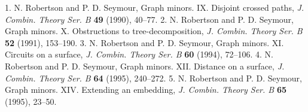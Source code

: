 
1. N. Robertson and P. D. Seymour, Graph minors. IX. Disjoint crossed paths, \textit{J. Combin. Theory Ser. B} \textbf{49} (1990), 40--77. 2. N. Robertson and P. D. Seymour, Graph minors. X. Obstructions to tree-decomposition, \textit{J. Combin. Theory Ser. B} \textbf{52} (1991), 153--190. 3. N. Robertson and P. D. Seymour, Graph minors. XI. Circuits on a surface, \textit{J. Combin. Theory Ser. B} \textbf{60} (1994), 72--106. 4. N. Robertson and P. D. Seymour, Graph minors. XII. Distance on a surface, \textit{J. Combin. Theory Ser. B} \textbf{64} (1995), 240--272. 5. N. Robertson and P. D. Seymour, Graph minors. XIV. Extending an embedding, \textit{J. Combin. Theory Ser. B} \textbf{65} (1995), 23--50.
